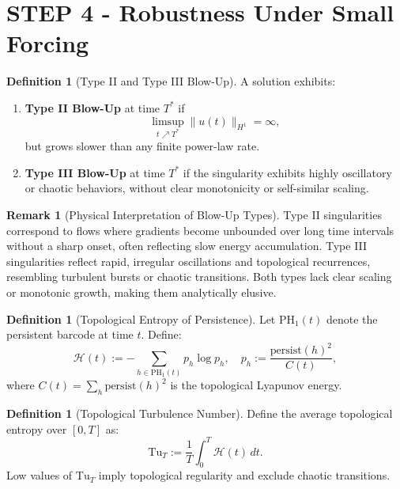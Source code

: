 \documentclass[11pt]{article}
\theoremstyle{definition}
\newtheorem{definition}[theorem]{Definition}
\newtheorem{remark}[theorem]{Remark}
\begin{document}
\section{STEP 4 - Robustness Under Small Forcing}

\begin{definition}[Type II and Type III Blow-Up]
A solution exhibits:
\begin{enumerate}
  \item \textbf{Type II Blow-Up} at time $T^*$ if
  \[
  \limsup_{t \nearrow T^*} \|u(t)\|_{H^1} = \infty,
  \]
  but grows slower than any finite power-law rate.

  \item \textbf{Type III Blow-Up} at time $T^*$ if the singularity exhibits highly oscillatory or chaotic behaviors, without clear monotonicity or self-similar scaling.
\end{enumerate}
\end{definition}

\begin{remark}[Physical Interpretation of Blow-Up Types]
Type II singularities correspond to flows where gradients become unbounded over long time intervals without a sharp onset, often reflecting slow energy accumulation. Type III singularities reflect rapid, irregular oscillations and topological recurrences, resembling turbulent bursts or chaotic transitions. Both types lack clear scaling or monotonic growth, making them analytically elusive.
\end{remark}

\begin{definition}[Topological Entropy of Persistence]
Let $\mathrm{PH}_1(t)$ denote the persistent barcode at time $t$. Define:
\[
\mathcal{H}(t) := -\sum_{h \in \mathrm{PH}_1(t)} p_h \log p_h, \quad p_h := \frac{\mathrm{persist}(h)^2}{C(t)},
\]
where $C(t) = \sum_{h} \mathrm{persist}(h)^2$ is the topological Lyapunov energy.
\end{definition}

\begin{definition}[Topological Turbulence Number]
Define the average topological entropy over $[0,T]$ as:
\[
\mathrm{Tu}_T := \frac{1}{T} \int_0^T \mathcal{H}(t) \, dt.
\]
Low values of $\mathrm{Tu}_T$ imply topological regularity and exclude chaotic transitions.
\end{definition}
\end{document}

